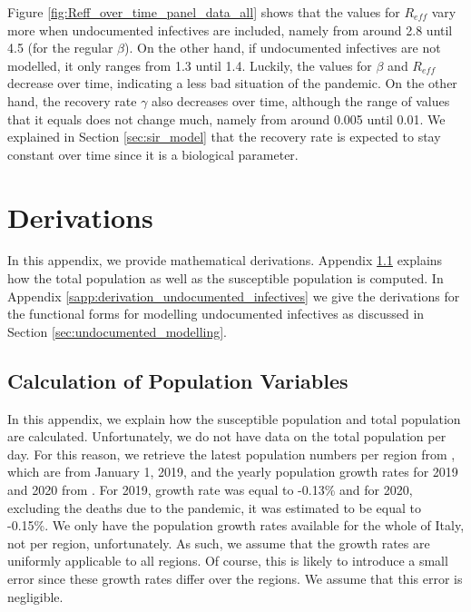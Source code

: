 \documentclass[12pt]{article}
\begin{document}
\begin{appendices}
		Figure \ref{fig:Reff_over_time_panel_data_all} shows that the values for $R_{eff}$ vary more when undocumented infectives are included, namely from around 2.8 until 4.5 (for the regular $\beta$). On the other hand, if undocumented infectives are not modelled, it only ranges from 1.3 until 1.4. Luckily, the values for $\beta$ and $R_{eff}$ decrease over time, indicating a less bad situation of the pandemic. On the other hand, the recovery rate $\gamma$ also decreases over time, although the range of values that it equals does not change much, namely from around 0.005 until 0.01. We explained in Section \ref{sec:sir_model} that the recovery rate is expected to stay constant over time since it is a biological parameter.
		
		\section{Derivations} \label{app:derivations}
		In this appendix, we provide mathematical derivations. Appendix \ref{sapp:derivation_population_variables} explains how the total population as well as the susceptible population is computed. In Appendix \ref{sapp:derivation_undocumented_infectives} we give the derivations for the functional forms for modelling undocumented infectives as discussed in Section \ref{sec:undocumented_modelling}.
		
		\subsection{Calculation of Population Variables}\label{sapp:derivation_population_variables}
		In this appendix, we explain how the susceptible population and total population are calculated. Unfortunately, we do not have data on the total population per day. For this reason, we retrieve the latest population numbers per region from \textcite{eurostatDatabase}, which are from January 1, 2019, and the yearly population growth rates for 2019 and 2020 from \textcite{worldometer2020italypopulation}. For 2019, growth rate was equal to -0.13\% and for 2020, excluding the deaths due to the pandemic, it was estimated to be equal to -0.15\%. We only have the population growth rates available for the whole of Italy, not per region, unfortunately. As such, we assume that the growth rates are uniformly applicable to all regions. Of course, this is likely to introduce a small error since these growth rates differ over the regions. We assume that this error is negligible. \\
		

\end{appendices}
\end{document}
